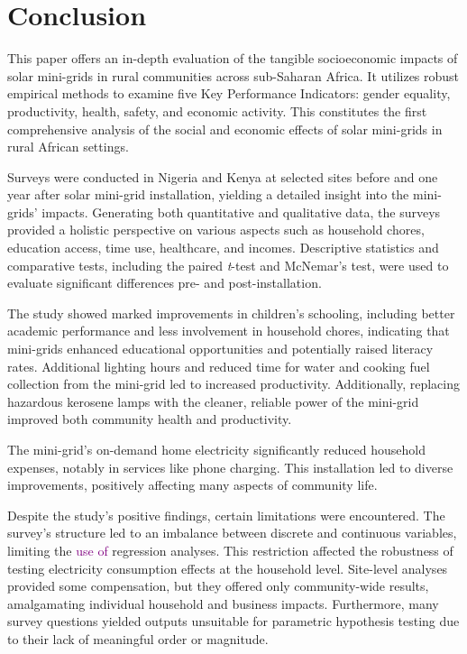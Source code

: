 \section{Conclusion}
\label{sec:conclusion}
This paper offers an in-depth evaluation of the tangible socioeconomic impacts of solar mini-grids in rural communities across sub-Saharan Africa. It utilizes robust empirical methods to examine five Key Performance Indicators: gender equality, productivity, health, safety, and economic activity. This constitutes the first comprehensive analysis of the social and economic effects of solar mini-grids in rural African settings.

Surveys were conducted in Nigeria and Kenya at selected sites before and one year after solar mini-grid installation, yielding a detailed insight into the mini-grids' impacts. Generating both quantitative and qualitative data, the surveys provided a holistic perspective on various aspects such as household chores, education access, time use, healthcare, and incomes. Descriptive statistics and comparative tests, including the paired \textit{t}-test and McNemar's test, were used to evaluate significant differences pre- and post-installation.

The study showed marked improvements in children's schooling, including better academic performance and less involvement in household chores, indicating that mini-grids enhanced educational opportunities and potentially raised literacy rates. Additional lighting hours and reduced time for water and cooking fuel collection from the mini-grid led to increased productivity. Additionally, replacing hazardous kerosene lamps with the cleaner, reliable power of the mini-grid improved both community health and productivity.

The mini-grid's on-demand home electricity significantly reduced household expenses, notably in services like phone charging. This installation led to diverse improvements, positively affecting many aspects of community life.

Despite the study's positive findings, certain limitations were encountered. The survey's structure led to an imbalance between discrete and continuous variables, limiting the \textcolor{purple}{use of} regression analyses. This restriction affected the robustness of testing electricity consumption effects at the household level. Site-level analyses provided some compensation, but they offered only community-wide results, amalgamating individual household and business impacts. Furthermore, many survey questions yielded outputs unsuitable for parametric hypothesis testing due to their lack of meaningful order or magnitude.

